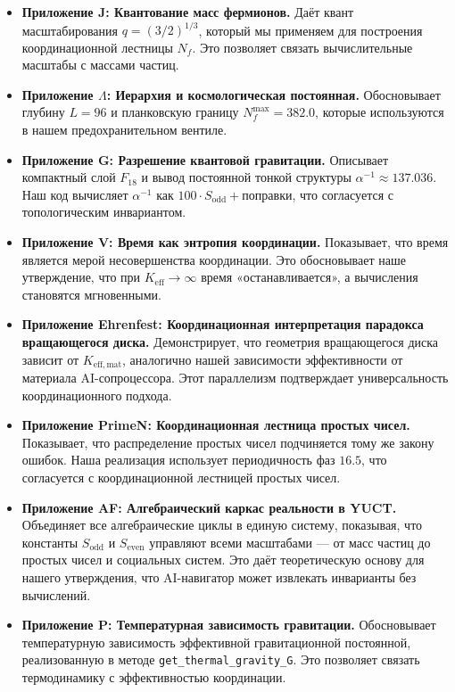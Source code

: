 \documentclass[12pt,a4paper]{article}
\begin{document}
\begin{itemize}
		\item \textbf{Приложение J: Квантование масс фермионов.}  
		Даёт квант масштабирования \(q = (3/2)^{1/3}\), который мы применяем для построения координационной лестницы \(N_f\). Это позволяет связать вычислительные масштабы с массами частиц.
		
		\item \textbf{Приложение \(\Lambda\): Иерархия и космологическая постоянная.}  
		Обосновывает глубину \(L = 96\) и планковскую границу \(N_f^{\max} = 382.0\), которые используются в нашем предохранительном вентиле.
		
		\item \textbf{Приложение G: Разрешение квантовой гравитации.}  
		Описывает компактный слой \(F_{18}\) и вывод постоянной тонкой структуры \(\alpha^{-1} \approx 137.036\). Наш код вычисляет \(\alpha^{-1}\) как \(100 \cdot S_{\mathrm{odd}} + \text{поправки}\), что согласуется с топологическим инвариантом.
		
		\item \textbf{Приложение V: Время как энтропия координации.}  
		Показывает, что время является мерой несовершенства координации. Это обосновывает наше утверждение, что при \(K_{\mathrm{eff}} \to \infty\) время «останавливается», а вычисления становятся мгновенными.
		
		\item \textbf{Приложение Ehrenfest: Координационная интерпретация парадокса вращающегося диска.}  
		Демонстрирует, что геометрия вращающегося диска зависит от \(K_{\mathrm{eff,mat}}\), аналогично нашей зависимости эффективности от материала AI-сопроцессора. Этот параллелизм подтверждает универсальность координационного подхода.
		
		\item \textbf{Приложение PrimeN: Координационная лестница простых чисел.}  
		Показывает, что распределение простых чисел подчиняется тому же закону ошибок. Наша реализация использует периодичность фаз \(16.5\), что согласуется с координационной лестницей простых чисел.
		
		\item \textbf{Приложение AF: Алгебраический каркас реальности в YUCT.}  
		Объединяет все алгебраические циклы в единую систему, показывая, что константы \(S_{\mathrm{odd}}\) и \(S_{\mathrm{even}}\) управляют всеми масштабами — от масс частиц до простых чисел и социальных систем. Это даёт теоретическую основу для нашего утверждения, что AI-навигатор может извлекать инварианты без вычислений.
		
		\item \textbf{Приложение P: Температурная зависимость гравитации.}  
		Обосновывает температурную зависимость эффективной гравитационной постоянной, реализованную в методе \texttt{get\_thermal\_gravity\_G}. Это позволяет связать термодинамику с эффективностью координации.
	\end{itemize}
	
\end{document}

